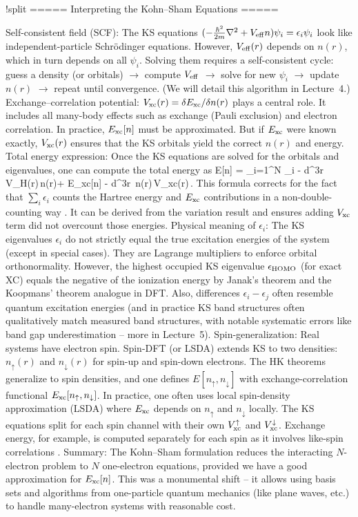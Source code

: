 !split
===== Interpreting the Kohn–Sham Equations =====

Self-consistent field (SCF): The KS equations $(-\frac{\hbar^2}{2m}\nabla^2 + V_{\rm eff}n)\psi_i = \epsilon_i\psi_i$ look like independent-particle Schrödinger equations. However, $V_{\rm eff}(r)$ depends on $n(r)$, which in turn depends on all ${\psi_i}$. Solving them requires a self-consistent cycle: guess a density (or orbitals) $\rightarrow$ compute $V_{\rm eff}$ $\rightarrow$ solve for new $\psi_i$ $\rightarrow$ update $n(r)$ $\rightarrow$ repeat until convergence. (We will detail this algorithm in Lecture 4.)
Exchange–correlation potential: $V_{\rm xc}(r) = \delta E_{\rm xc}/\delta n(r)$ plays a central role. It includes all many-body effects such as exchange (Pauli exclusion) and electron correlation. In practice, $E_{\rm xc}[n]$ must be approximated. But if $E_{\rm xc}$ were known exactly, $V_{\rm xc}(r)$ ensures that the KS orbitals yield the correct $n(r)$ and energy.
Total energy expression: Once the KS equations are solved for the orbitals and eigenvalues, one can compute the total energy as E[n] = \sum_{i=1}^N \epsilon_i \;-\; \int d^3r\, V_{\rm H}(r)\,n(r)\;+\; E_{\rm xc}[n] \;-\; \int d^3r\, n(r)\,V_{\rm xc}(r)\,. This formula corrects for the fact that $\sum_i \epsilon_i$ counts the Hartree energy and $E_{\rm xc}$ contributions in a non-double-counting way . It can be derived from the variation result and ensures adding $V_{\rm xc}$ term did not overcount those energies.
Physical meaning of $\epsilon_i$: The KS eigenvalues $\epsilon_i$ do not strictly equal the true excitation energies of the system (except in special cases). They are Lagrange multipliers to enforce orbital orthonormality. However, the highest occupied KS eigenvalue $\epsilon_{\rm HOMO}$ (for exact XC) equals the negative of the ionization energy by Janak’s theorem and the Koopmans’ theorem analogue in DFT. Also, differences $\epsilon_{i}-\epsilon_{j}$ often resemble quantum excitation energies (and in practice KS band structures often qualitatively match measured band structures, with notable systematic errors like band gap underestimation – more in Lecture 5).
Spin-generalization: Real systems have electron spin. Spin-DFT (or LSDA) extends KS to two densities: $n_\uparrow(r)$ and $n_\downarrow(r)$ for spin-up and spin-down electrons. The HK theorems generalize to spin densities, and one defines $E[n_\uparrow,n_\downarrow]$ with exchange-correlation functional $E_{\rm xc}[n_\uparrow,n_\downarrow]$. In practice, one often uses local spin-density approximation (LSDA) where $E_{\rm xc}$ depends on $n_\uparrow$ and $n_\downarrow$ locally. The KS equations split for each spin channel with their own $V_{\rm xc}^\uparrow$ and $V_{\rm xc}^\downarrow$. Exchange energy, for example, is computed separately for each spin as it involves like-spin correlations .
Summary: The Kohn–Sham formulation reduces the interacting $N$-electron problem to $N$ one-electron equations, provided we have a good approximation for $E_{\rm xc}[n]$. This was a monumental shift – it allows using basis sets and algorithms from one-particle quantum mechanics (like plane waves, etc.) to handle many-electron systems with reasonable cost. 

